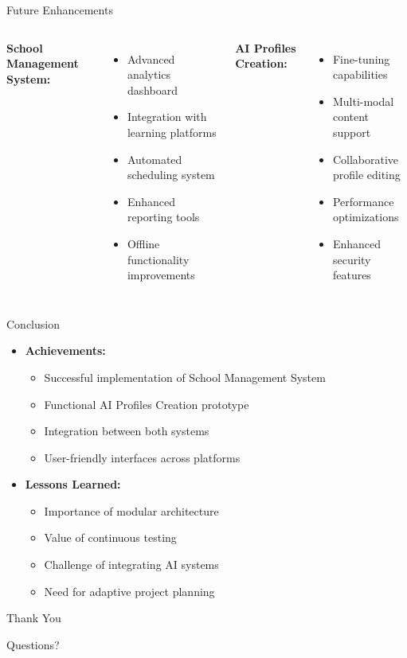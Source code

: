 \documentclass[aspectratio=169]{beamer}
\begin{document}
\begin{frame}{Future Enhancements}
    \begin{columns}
        \textbf{School Management System:}
        \begin{itemize}
            \item Advanced analytics dashboard
            \item Integration with learning platforms
            \item Automated scheduling system
            \item Enhanced reporting tools
            \item Offline functionality improvements
        \end{itemize}
        \textbf{AI Profiles Creation:}
        \begin{itemize}
            \item Fine-tuning capabilities
            \item Multi-modal content support
            \item Collaborative profile editing
            \item Performance optimizations
            \item Enhanced security features
        \end{itemize}
    \end{columns}
\end{frame}

\begin{frame}{Conclusion}
    \begin{itemize}
        \item \textbf{Achievements:}
        \begin{itemize}
            \item Successful implementation of School Management System
            \item Functional AI Profiles Creation prototype
            \item Integration between both systems
            \item User-friendly interfaces across platforms
        \end{itemize}
        \vspace{0.5cm}
        \item \textbf{Lessons Learned:}
        \begin{itemize}
            \item Importance of modular architecture
            \item Value of continuous testing
            \item Challenge of integrating AI systems
            \item Need for adaptive project planning
        \end{itemize}
    \end{itemize}
\end{frame}

\begin{frame}
    \begin{center}
        \Huge Thank You
        \vspace{1cm}
        
        \Large Questions?
    \end{center}
\end{frame}
\end{document}
